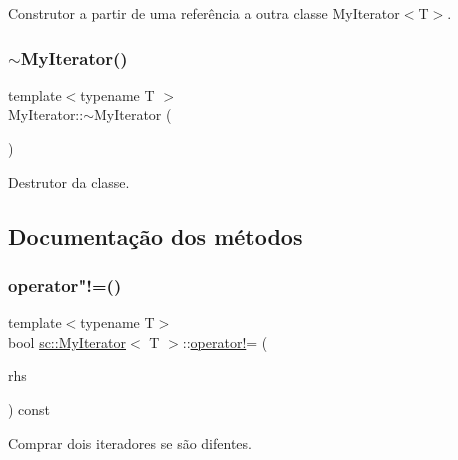 Construtor a partir de uma referência a outra classe My\+Iterator$<$\+T$>$. 

\mbox{\label{classsc_1_1MyIterator_ae61c838df11b715349ffd198bc85e50f}} 
\subsubsection{\texorpdfstring{$\sim$\+My\+Iterator()}{~MyIterator()}}
{\footnotesize\ttfamily template$<$typename T $>$ \\
My\+Iterator\+::$\sim$\+My\+Iterator (\begin{DoxyParamCaption}{ }\end{DoxyParamCaption})\hspace{0.3cm}{\ttfamily [default]}}



Destrutor da classe. 



\subsection{Documentação dos métodos}
\mbox{\label{classsc_1_1MyIterator_a6a64ad5515a5111089f73871a140e48c}} 
\subsubsection{\texorpdfstring{operator"!=()}{operator!=()}}
{\footnotesize\ttfamily template$<$typename T$>$ \\
bool \hyperlink{classsc_1_1MyIterator}{sc\+::\+My\+Iterator}$<$ T $>$\+::\hyperlink{game__classes_8hpp_a5dea3f07ccd43cf7042c728d769e92fc}{operator!}= (\begin{DoxyParamCaption}\item[{const \hyperlink{classsc_1_1MyIterator}{My\+Iterator}$<$ T $>$ \&}]{rhs }\end{DoxyParamCaption}) const}



Comprar dois iteradores se são difentes. 

\mbox{\label{classsc_1_1MyIterator_ae655a959eee3b7ed2bc9a897c537810a}} 
